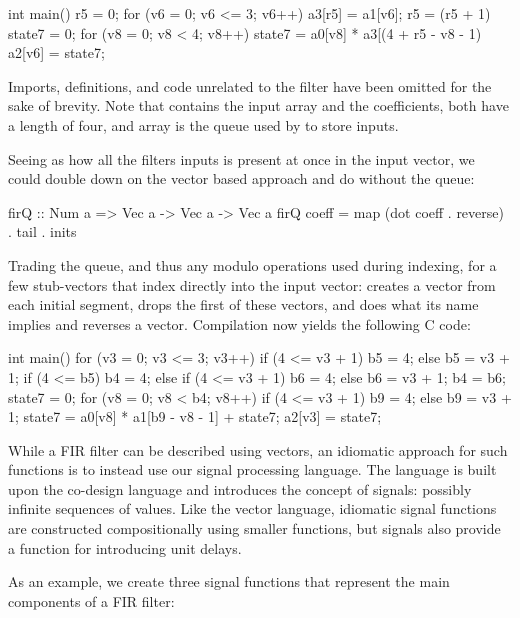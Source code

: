 \documentclass[../paper.tex]{subfiles}
\begin{document}
\begin{code}
int main() {    
  r5 = 0;
  for (v6 = 0; v6 <= 3; v6++) {
    a3[r5] = a1[v6];
    r5 = (r5 + 1) %
    state7 = 0;
    for (v8 = 0; v8 < 4; v8++)
      state7 = a0[v8] * a3[(4 + r5 - v8 - 1) %
    a2[v6] = state7;
  }
}
\end{code}

\noindent Imports, definitions, and code unrelated to the filter have been omitted for the sake of brevity. Note that  contains the input array and  the coefficients, both have a length of four, and array  is the queue used by  to store inputs.

Seeing as how all the filters inputs is present at once in the input vector, we could double down on the vector based approach and do without the queue:

\begin{code}
firQ :: Num a => Vec a -> Vec a -> Vec a
firQ coeff = map (dot coeff . reverse) . tail . inits
\end{code}

\noindent Trading the queue, and thus any modulo operations used during indexing, for a few stub-vectors that index directly into the input vector:  creates a vector from each initial segment,  drops the first of these vectors, and  does what its name implies and reverses a vector. Compilation now yields the following C code:

\begin{code}
int main() {
  for (v3 = 0; v3 <= 3; v3++) {
    if (4 <= v3 + 1) { b5 = 4; } else { b5 = v3 + 1; }
    if (4 <= b5) { b4 = 4; }
    else {
      if (4 <= v3 + 1) { b6 = 4; } else { b6 = v3 + 1; }
      b4 = b6;
    }
    state7 = 0;
    for (v8 = 0; v8 < b4; v8++) {
      if (4 <= v3 + 1) { b9 = 4; } else { b9 = v3 + 1; }
      state7 = a0[v8] * a1[b9 - v8 - 1] + state7;
    }
    a2[v3] = state7;
  }
}
\end{code}

While a FIR filter can be described using vectors, an idiomatic approach for such functions is to instead use our signal processing language. The language is built upon the co-design language and introduces the concept of signals: possibly infinite sequences of values. Like the vector language, idiomatic signal functions are constructed compositionally using smaller functions, but signals also provide a function for introducing unit delays.

As an example, we create three signal functions that represent the main components of a FIR filter:
\end{document}
